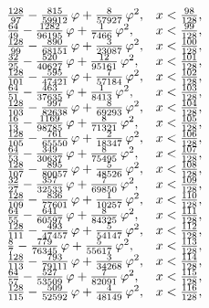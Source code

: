 \begin{equation*}
\begin{array}{@{}l l@{}}
		\frac{128}{97} - \frac{815}{59912}\,\varphi + \frac{8}{57927}\,\varphi^2, & x < \frac{98}{128},\\
		\frac{64}{49} - \frac{1282}{96195}\,\varphi + \frac{1}{7466}\,\varphi^2, & x < \frac{99}{128},\\
		\frac{128}{99} - \frac{890}{68151}\,\varphi + \frac{3}{23087}\,\varphi^2, & x < \frac{100}{128},\\
		\frac{32}{25} - \frac{520}{40627}\,\varphi + \frac{12}{95161}\,\varphi^2, & x < \frac{101}{128},\\
		\frac{128}{101} - \frac{595}{47421}\,\varphi + \frac{7}{57184}\,\varphi^2, & x < \frac{102}{128},\\
		\frac{64}{51} - \frac{463}{37635}\,\varphi + \frac{1}{8413}\,\varphi^2, & x < \frac{103}{128},\\
		\frac{128}{103} - \frac{997}{82638}\,\varphi + \frac{8}{69293}\,\varphi^2, & x < \frac{104}{128},\\
		\frac{16}{13} - \frac{1169}{98785}\,\varphi + \frac{8}{71321}\,\varphi^2, & x < \frac{105}{128},\\
		\frac{128}{105} - \frac{761}{65550}\,\varphi + \frac{2}{18347}\,\varphi^2, & x < \frac{106}{128},\\
		\frac{64}{53} - \frac{349}{30637}\,\varphi + \frac{8}{75495}\,\varphi^2, & x < \frac{107}{128},\\
		\frac{128}{107} - \frac{895}{80057}\,\varphi + \frac{5}{48526}\,\varphi^2, & x < \frac{108}{128},\\
		\frac{32}{27} - \frac{357}{32533}\,\varphi + \frac{7}{69850}\,\varphi^2, & x < \frac{109}{128},\\
		\frac{128}{109} - \frac{836}{77601}\,\varphi + \frac{1}{10257}\,\varphi^2, & x < \frac{110}{128},\\
		\frac{64}{55} - \frac{641}{60597}\,\varphi + \frac{8}{84325}\,\varphi^2, & x < \frac{111}{128},\\
		\frac{128}{111} - \frac{493}{47457}\,\varphi + \frac{5}{54147}\,\varphi^2, & x < \frac{112}{128},\\
		\frac{8}{7} - \frac{779}{76345}\,\varphi + \frac{5}{55617}\,\varphi^2, & x < \frac{113}{128},\\
		\frac{128}{113} - \frac{793}{79111}\,\varphi + \frac{3}{34268}\,\varphi^2, & x < \frac{114}{128},\\
		\frac{64}{57} - \frac{527}{53509}\,\varphi + \frac{7}{82091}\,\varphi^2, & x < \frac{115}{128},\\
		\frac{128}{115} - \frac{509}{52592}\,\varphi + \frac{4}{48149}\,\varphi^2, & x < \frac{116}{128},\\

\end{array}
\end{equation*}
